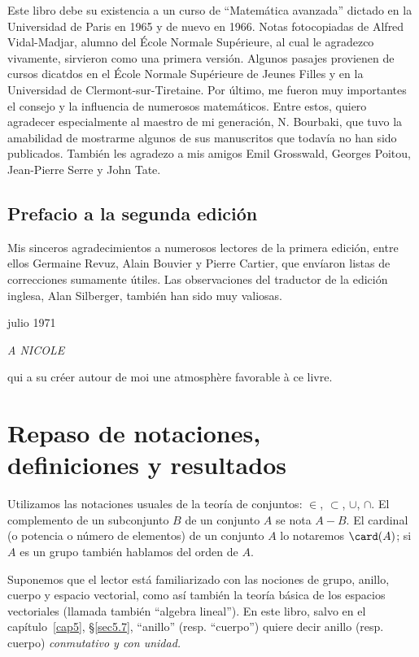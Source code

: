 \documentclass[bibtotoc,leqno,spanish]{amsbook}
\numberwithin{equation}{section}
\theoremstyle{note}
\theoremstyle{note}
\theoremstyle{rem}
\numberwithin{theorem}{section}
\numberwithin{proposition}{section}
\numberwithin{definition}{section}
\numberwithin{lemma}{section}
\numberwithin{corollary}{section}
\numberwithin{example}{section}
\numberwithin{footnote}{section}%
\begin{document}
Este libro debe su existencia a un curso de ``Matem\'atica avanzada''
dictado en la Universidad de Paris en 1965 y de nuevo en 1966.
Notas fotocopiadas de {Alfred Vidal-Madjar,} alumno del \'Ecole
Normale Sup\'erieure, al cual le agradezco vivamente, sirvieron
como una primera versi\'on. Algunos pasajes provienen de cursos dicatdos
en el \'Ecole Normale Sup\'erieure de Jeunes Filles y en la Universidad
de Clermont-sur-Tiretaine. Por \'ultimo, me fueron muy importantes el consejo
y la influencia de numerosos matem\'aticos. Entre estos, quiero agradecer
especialmente al maestro de mi generaci\'on, {N. Bourbaki,} que tuvo la
amabilidad de mostrarme algunos de sus manuscritos que todav\'ia no han sido
publicados. Tambi\'en les agradezo a mis amigos {Emil Grosswald,} {Georges
Poitou,} {Jean-Pierre Serre} y {John Tate.}

\section*{Prefacio a la segunda edici\'on}

Mis sinceros agradecimientos a numerosos lectores de la primera
edici\'on, entre ellos Germaine Revuz, Alain Bouvier y Pierre Cartier,
que env\'iaron listas de correcciones sumamente \'utiles. Las observaciones
del traductor de la edici\'on inglesa, Alan Silberger, tambi\'en han sido
muy valiosas.

\begin{flushright}
julio 1971
\end{flushright}

{
\itshape
A NICOLE

qui a su cr\'eer autour de moi
une atmosph\`ere favorable \`a ce livre.
}

\chapter*{Repaso de notaciones,\\ definiciones y resultados}

Utilizamos las notaciones usuales de la teor\'ia de conjuntos:
$\in$, $\subset$, $\cup$, $\cap$.
El complemento de un subconjunto $B$ de un conjunto $A$ se nota $A - B$.
El cardinal (o potencia o n\'umero de elementos) de un conjunto $A$ lo notaremos
$\card(A)$; si $A$ es un grupo tambi\'en hablamos del orden de $A$.

Suponemos que el lector est\'a familiarizado
con las nociones de grupo, anillo, cuerpo y espacio vectorial,
como as\'i tambi\'en la teor\'ia b\'asica de los espacios vectoriales
(llamada tambi\'en ``algebra lineal''). En este libro, salvo en el cap\'itulo~\ref{cap5},
\S\ref{sec5.7}, ``anillo'' (resp. ``cuerpo'') quiere decir anillo (resp. cuerpo)
\emph{conmutativo y con unidad.}
\end{document}
